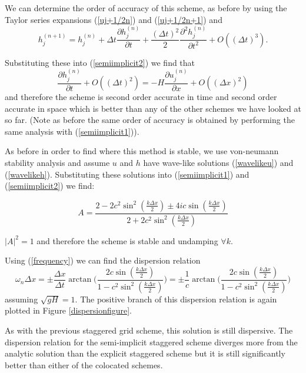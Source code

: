 \documentclass[a4paper,12pt, notitlepage]{report}
\begin{document}
We can determine the order of accuracy of this scheme, as before by using the Taylor series expansions (\ref{uj+1/2n}) and (\ref{uj+1/2n+1}) and
\begin{equation}
h_{j}^{(n+ 1)} = h_{j}^{(n)} + \Delta t \frac{\partial h_{j}^{(n)}}{\partial t} + \frac{(\Delta t)^{2}}{2}\frac{\partial^{2} h_{j}^{(n)}}{\partial t^{2}} + O((\Delta t)^{3}).
\end{equation}

Substituting these into (\ref{semiimplicit2}) we find that
\begin{equation}
\frac{\partial h_{j}^{(n)}}{\partial t} + O((\Delta t)^{2}) = - H \frac{\partial u_{j}^{(n)}}{\partial x} + O((\Delta x)^{2}) 
\end{equation}
and therefore the scheme is second order accurate in time and second order accurate in space which is better than any of the other schemes we have looked at so far. (Note as before the same order of accuracy is obtained by performing the same analysis with (\ref{semiimplicit1})).

As before in order to find where this method is stable, we use von-neumann stability analysis and assume $u$ and $h$ have wave-like solutions (\ref{wavelikeu}) and (\ref{wavelikeh}). Substituting these solutions into (\ref{semiimplicit1}) and (\ref{semiimplicit2}) we find:

\begin{equation}
A = \frac{2 - 2c^{2}\sin^{2}(\frac{k\Delta x}{2}) \pm 4ic\sin(\frac{k\Delta x}{2})}{2 + 2 c^{2}\sin^{2}(\frac{k\Delta x}{2})}
\end{equation}

$\lvert A \rvert^{2} = 1$ and therefore the scheme is stable and undamping $\forall k$.

Using (\ref{frequency}) we can find the dispersion relation
\begin{equation}
\omega_{n} \Delta x = \pm\frac{\Delta x}{\Delta t} \arctan\bigg(\frac{2 c \sin(\frac{k\Delta x}{2})}{1 - c^{2} \sin^{2}(\frac{k\Delta x}{2})}\bigg) = \pm\frac{1}{c} \arctan\bigg(\frac{2 c \sin(\frac{k\Delta x}{2})}{1 - c^{2} \sin^{2}(\frac{k\Delta x}{2})}\bigg)
\end{equation}
assuming $\sqrt{gH} = 1$. The positive branch of this dispersion relation is again plotted in Figure \ref{dispersionfigure}. 

As with the previous staggered grid scheme, this solution is still dispersive. The dispersion relation for the semi-implicit staggered scheme diverges more from the analytic solution than the explicit staggered scheme but it is still significantly better than either of the colocated schemes. 
\end{document}
